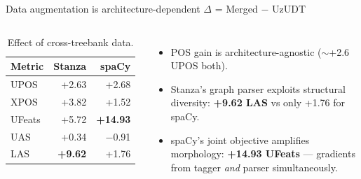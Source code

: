 \documentclass[t,10pt]{beamer}
\newcommand{\best}[1]{\textcolor{edmgreen}{\textbf{#1}}}
\begin{document}
\begin{frame}{Data augmentation is architecture-dependent}%
             {$\Delta$ = Merged $-$ UzUDT}
  \begin{columns}[onlytextwidth]
      \begin{table}
        \small
        \begin{tabular}{lrr}
          \textbf{Metric} & \textbf{Stanza} & \textbf{spaCy}\\
          \toprule
          UPOS   & +2.63        & +2.68\\
          XPOS   & +3.82        & +1.52\\
          UFeats & +5.72        & \best{+14.93}\\
          UAS    & +0.34        & $-$0.91\\
          LAS    & \best{+9.62} & +1.76\\
          \bottomrule
        \end{tabular}
        \caption{Effect of cross-treebank data.}
      \end{table}
      \footnotesize
      \begin{itemize}
        \item POS gain is \alert{architecture-agnostic}
              ($\sim$+2.6 UPOS both).
        \item Stanza's graph parser exploits structural diversity:
              \best{+9.62 LAS} vs only +1.76 for spaCy.
        \item spaCy's joint objective amplifies morphology:
              \best{+14.93 UFeats} --- gradients from tagger
              \emph{and} parser simultaneously.
      \end{itemize}
  \end{columns}
\end{frame}
\end{document}

